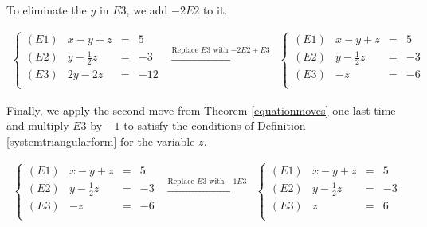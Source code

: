 \documentclass{ximera}
\begin{document}
\begin{example}
\begin{enumerate}
To eliminate the $y$ in $E3$, we add $-2E2$ to it.

\[\begin{array}{ccc}

\left\{ 

\begin{array}{lrcr}

(E1) & x-y+z & = & 5 \\
(E2) & y - \frac{1}{2}z & = & -3\\
(E3) & 2y-2z & = & -12 \\

\end{array} 

\right.
&
\xrightarrow{\text{Replace $E3$ with $-2E2 + E3$}}

&

\left\{ 

\begin{array}{lrcr}

(E1) & x-y+z & = & 5 \\
(E2) & y - \frac{1}{2}z & = & -3\\
(E3) & -z & = & -6 \\

\end{array} 

\right.
\end{array}\]

Finally, we apply the second move from  Theorem \ref{equationmoves} one last time and multiply $E3$ by $-1$ to satisfy the conditions of Definition \ref{systemtriangularform} for the variable $z$.

\[\begin{array}{ccc}


\left\{ 

\begin{array}{lrcr}

(E1) & x-y+z & = & 5 \\
(E2) & y - \frac{1}{2}z & = & -3\\
(E3) & -z & = & -6 \\

\end{array} 

\right.

&
\xrightarrow{\text{Replace $E3$ with $-1E3$}}

&
\left\{ 

\begin{array}{lrcr}

(E1) & x-y+z & = & 5 \\
(E2) & y - \frac{1}{2}z & = & -3\\
(E3) & z & = & 6 \\


\end{array}
\end{array}\]
\end{enumerate}
\end{example}
\end{document}
